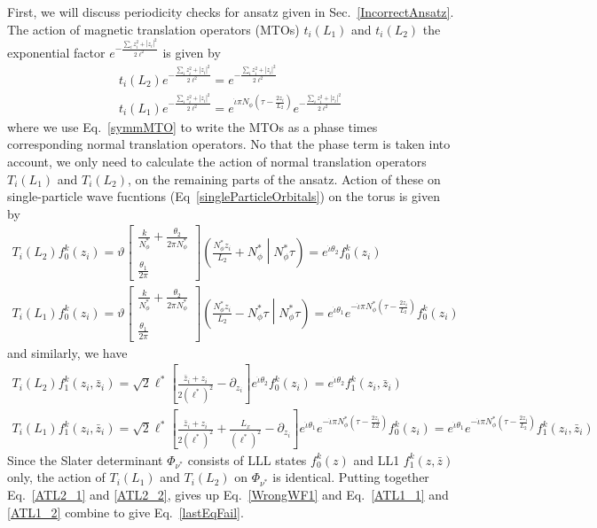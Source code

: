 \documentclass[prb,aps,epsfig,longbibliography,twocolumn]{revtex4-1}
\newcommand{\rbkt}[1]{\left( #1\right)}
\newcommand{\sbkt}[1]{\left[ #1\right]}
\newcommand{\np}{N_{\phi}}
\newcommand{\jbkt}[2]{\left( #1 \middle| #2\right)}
\newcommand{\rtheta}[4]{\vartheta \sbkt{ \substack{{#1} \\ \\{#2}}}	\jbkt{#3}{#4}}
\newcommand{\iiota}{\dot{\iota}}
\begin{document}
First, we will discuss periodicity checks for ansatz given in Sec.~\ref{IncorrectAnsatz}. The action of  magnetic translation operators (MTOs) $t_i(L_1)$ and $t_i(L_2)$ the exponential factor ${e^{-\frac{\sum_i z^2_i+|z_i|^2 }{2\ell^2}}}$ is given by
\begin{gather}
t_i(L_2){e^{-\frac{\sum_i z^2_i+|z_i|^2 }{2\ell^2}}}= {e^{-\frac{\sum_i z^2_i+|z_i|^2 }{2\ell^2}}} \\
t_i(L_1){e^{-\frac{\sum_i z^2_i+|z_i|^2 }{2\ell^2}}}= e^{\iiota \pi \np \rbkt{\tau-\frac{2z_i}{L_2}} }{e^{-\frac{\sum_i z^2_i+|z_i|^2 }{2\ell^2}}}
\end{gather}
where we use Eq.~\ref{symmMTO} to write the MTOs as a phase times corresponding normal translation operators. No that the phase term is taken into account, we only need to calculate the action of normal translation operators $T_i(L_1)$ and $T_i(L_2)$, on the remaining parts of the ansatz. Action of these on single-particle wave fucntions (Eq~\eqref{singleParticleOrbitals}) on the torus is given by
\begin{gather}
T_i(L_2) f_0^{k}(z_i) = \rtheta{\frac{k}{\np^*} +\frac{\theta_2}{2\pi \np^*}}{\frac{\theta_1}{2\pi}}{\frac{\np^* z_i}{L_2} +\np^*}{\np^*\tau} = e^{\iiota \theta_2} f_0^{k}(z_i) \label{ATL2_1}\\
T_i(L_1) f_0^{k}(z_i) = \rtheta{\frac{k}{\np^*} +\frac{\theta_2}{2\pi \np^*}}{\frac{\theta_1}{2\pi}}{\frac{\np^* z_i}{L_2} -\np^*\tau}{\np^*\tau} = e^{\iiota \theta_1} e^{-\iiota\pi\np^*\rbkt{\tau-\frac{2z_i}{L_2}}} f_0^{k}(z_i)  \label{ATL1_1}
\end{gather}
and similarly, we have
\begin{gather}
T_i(L_2) f_1^{k}(z_i,\bar{z}_i) = \sqrt{2}{\ell^{*}}\sbkt{\frac{\bar{z}_i+z_i}{2(\ell^*)^{2}} -\partial_{z_i}} e^{\iiota \theta_2} f^{k}_0(z_i) = e^{\iiota \theta_2} f_1^{k}(z_i,\bar{z}_i) \label{ATL1_2}\\
T_i(L_1) f_1^{k}(z_i,\bar{z}_i) = \sqrt{2}{\ell^{*}}\sbkt{\frac{\bar{z}_i+z_i}{2(\ell^*)^{2}} +\frac{L_x}{(\ell^*)^2} -\partial_{z_i}} e^{\iiota \theta_1} e^{-\iiota\pi\np^*\rbkt{\tau-\frac{2z_i}{L2}}} f_0^{k}(z_i)  = e^{\iiota \theta_1} e^{-\iiota\pi\np^*\rbkt{\tau-\frac{2z_i}{L_2}}} f_1^{k}(z_i,\bar{z}_i) \label{ATL2_2}
\end{gather}
Since the Slater determinant $\Phi_{\nu^*}$ consists of LLL states $f_0^k(z)$ and LL1 $f_1^k(z,\bar{z})$ only, the action of $T_i(L_1)$ and $T_i(L_2)$ on $\Phi_{\nu^*}$ 
is identical. Putting together Eq.~\eqref{ATL2_1} and \eqref{ATL2_2}, gives up Eq.~\eqref{WrongWF1} and Eq.~\eqref{ATL1_1} and \eqref{ATL1_2} combine to give  Eq.~\eqref{lastEqFail}.
\end{document}
